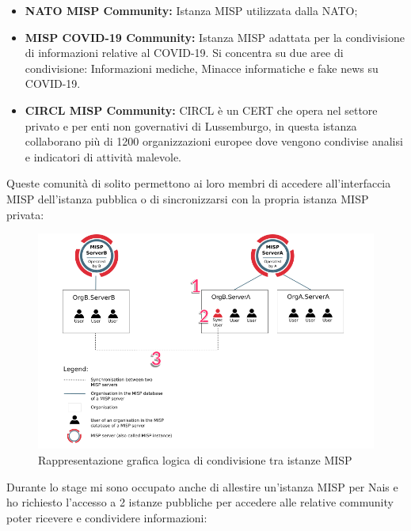 \begin{itemize}
    \item\textbf{NATO MISP Community:} Istanza MISP utilizzata dalla NATO;
     \item\textbf{MISP COVID-19 Community:} Istanza MISP adattata per la condivisione di informazioni relative al COVID-19. Si concentra su due aree di condivisione: Informazioni mediche, Minacce informatiche e fake news su COVID-19.
     \item\textbf{CIRCL MISP Community:} CIRCL è un CERT che opera nel settore privato e per enti non governativi di Lussemburgo, in questa istanza collaborano più di 1200 organizzazioni europee dove vengono condivise analisi e indicatori di attività malevole.
\end{itemize}

\newpage

Queste comunità di solito permettono ai loro membri di  accedere all'interfaccia MISP dell'istanza pubblica o di sincronizzarsi con la propria istanza MISP privata:

\begin{figure}[h]
    \begin{center}
        \includegraphics[width=0.98\columnwidth]{images/4_caso_d'uso_img/sunchMISP.png}
    \end{center}
    \caption{Rappresentazione grafica logica di condivisione tra istanze MISP}
    \label{fig:Rappresentazione grafica logica di condivisione tra istanze MISP}
\end{figure}

Durante lo stage mi sono occupato anche di allestire un’istanza MISP per Nais e ho richiesto l’accesso a 2 istanze pubbliche per accedere alle relative community poter ricevere e condividere informazioni:

